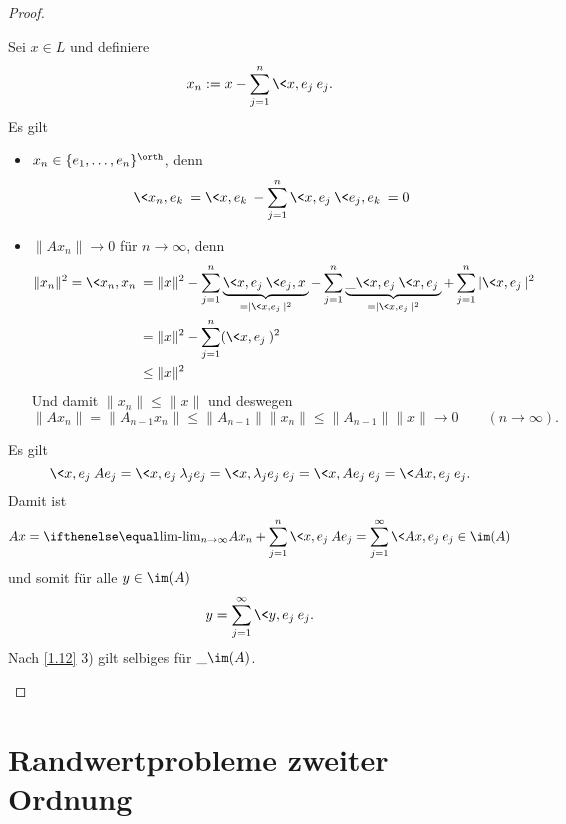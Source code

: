 \begin{st}
\begin{proof}
\begin{enumerate}[1)]
				Sei $x \in L$ und definiere
				\[
					x_n := x - \sum_{j=1}^n \<x,e_j\> e_j.
				\]
				Es gilt
				\begin{itemize}
					\item
						$x_n \in \{e_1,\dotsc,e_n\}^\orth$, denn
						\[
							\<x_n, e_k\> = \<x, e_k\> - \sum_{j=1}^n \<x,e_j\> \<e_j, e_k\> = 0
						\]
					\item
						$\|Ax_n\| \to 0$ für $n\to \infty$, denn
						\begin{align*}
							\|x_n\|^2  = \<x_n, x_n\>
							&= \|x\|^2 - \sum_{j=1}^n \underbrace{\<x,e_j\>\<e_j,x\>}_{=|\<x,e_j\>|^2} - \sum_{j=1}^n \underbrace{\_{\<x,e_j\>} \<x,e_j\>}_{=|\<x,e_j\>|^2} + \sum_{j=1}^n |\<x,e_j\>|^2 \\
							&= \|x\|^2 - \sum_{j=1}^n (\<x,e_j\>)^2 \\
							&\le \|x\|^2
						\end{align*}
						Und damit $\|x_n\| \le \|x\|$ und deswegen
						\[
							\|Ax_n\| = \|A_{n-1}x_n\| \le \|A_{n-1}\| \|x_n\| \le \|A_{n-1}\| \|x\| \to 0
							\qquad (n \to \infty).
						\]
				\end{itemize}
				Es gilt
				\[
					\<x,e_j\> A e_j
					= \<x,e_j\> \lambda_j e_j
					= \<x,\lambda_j e_j\> e_j
					= \<x,A e_j\> e_j
					= \<Ax,e_j\> e_j.
				\]
				Damit ist
				\[
					Ax = \lim_{n\to\infty} Ax_n + \sum_{j=1}^n \<x,e_j\> Ae_j = \sum_{j=1}^\infty \<Ax, e_j\> e_j \in \im (A)
				\]
				und somit für alle $y \in \im (A)$
				\[
					y = \sum_{j=1}^\infty \<y,e_j\> e_j.
				\]
				Nach \ref{1.12} 3) gilt selbiges für $\_{\im (A)}$.
		\end{enumerate}
	\end{proof}
\end{st}


\section{Randwertprobleme zweiter Ordnung}


